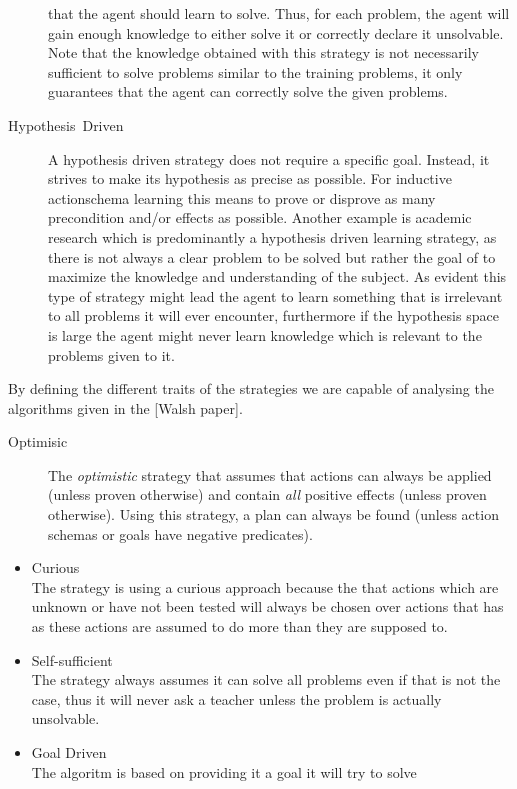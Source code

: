 \documentclass[master.tex]{subfiles}
\begin{document}
\begin{description}
    that the agent should learn to solve. Thus, for each problem, the
    agent will gain enough knowledge to either solve it or correctly declare
    it unsolvable. Note that the knowledge obtained with this strategy
    is not necessarily sufficient to solve problems similar to the training
    problems, it only guarantees that the agent can correctly solve the
    given problems.
    \item [{Hypothesis~Driven}] A hypothesis driven strategy does not require
    a specific goal. Instead, it strives to make its hypothesis as precise
    as possible. For inductive actionschema learning this means to prove
    or disprove as many precondition and/or effects as possible. Another
    example is academic research which is predominantly a hypothesis driven
    learning strategy, as there is not always a clear problem to be solved
    but rather the goal of to maximize the knowledge and understanding
    of the subject. As evident this type of strategy might lead the agent
    to learn something that is irrelevant to all problems it will ever
    encounter, furthermore if the hypothesis space is large the agent
    might never learn knowledge which is relevant to the problems given
    to it.
    \end{description}
    By defining the different traits of the strategies we are capable
    of analysing the algorithms given in the {[}Walsh paper{]}.
    \begin{description}
    \item [{Optimisic}] The \emph{optimistic} strategy that assumes that actions
    can always be applied (unless proven otherwise) and contain \emph{all}
    positive effects (unless proven otherwise). Using this strategy, a
    plan can always be found (unless action schemas or goals have negative
    predicates).\end{description}
    \begin{itemize}
    \item Curious\\
    The strategy is using a curious approach because the that actions
    which are unknown or have not been tested will always be chosen over
    actions that has as these actions are assumed to do more than they
    are supposed to.
    \item Self-sufficient\\
    The strategy always assumes it can solve all problems even if that
    is not the case, thus it will never ask a teacher unless the problem
    is actually unsolvable.
    \item Goal Driven\\
    The algoritm is based on providing it a goal it will try to solve\end{itemize}
\end{document}
